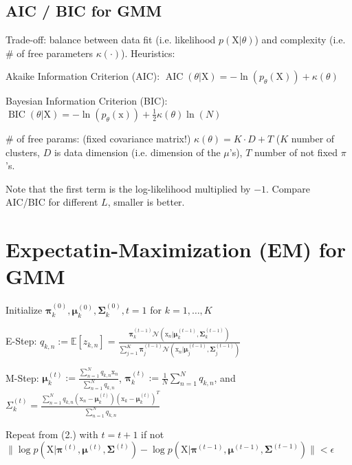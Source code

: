 \documentclass[a4paper, 11pt, landscape]{article}
\newcommand{\matr}[1]{\boldsymbol{\mathrm{#1}}}
\begin{document}
\begin{multicols*}{3}
\subsection{AIC / BIC for GMM}
Trade-off: balance between data fit (i.e. likelihood $p(\matr{X} | \theta)$) and complexity (i.e. \# of free parameters $\kappa(\cdot)$). Heuristics:
\begin{compactdesc}
	\item[Akaike Information Criterion (AIC):] $\operatorname{AIC}(\theta | \matr{X}) = -\ln(p_\theta(\matr{X})) + \kappa(\theta)$
	\item[Bayesian Information Criterion (BIC):] $\operatorname{BIC}(\theta | \matr{X}) = -\ln(p_\theta(\matr{x})) + \frac{1}{2} \kappa(\theta) \ln(N)$
	\item[\# of free params:] (fixed covariance matrix!) $\kappa(\theta) = K \cdot D + T$ ($K$ number of clusters, $D$ is data dimension (i.e. dimension of the $\mu$'s), $T$ number of not fixed $\pi$'s.
\end{compactdesc}
Note that the first term is the log-likelihood multiplied by $-1$. Compare AIC/BIC for different $L$, smaller is better.


\section{Expectatin-Maximization (EM) for GMM}
\begin{compactenum}
	\item Initialize $\boldsymbol{\pi}_k^{(0)}, \boldsymbol{\mu}_k^{(0)}, \boldsymbol{\Sigma}_k^{(0)}, t = 1$ for $k = 1, \ldots, K$
	\item E-Step: $q_{k,n} := \mathbb{E}[z_{k,n}] = \frac{\boldsymbol{\pi}_k^{(t-1)} \mathcal{N}(\matr{x}_n | \boldsymbol{\mu}_k^{(t-1)}, \boldsymbol{\Sigma}_k^{(t-1)})}{\sum_{j=1}^K \boldsymbol{\pi}_j^{(t-1)} \mathcal{N}(\matr{x}_n | \boldsymbol{\mu}_j^{(t-1)}, \boldsymbol{\Sigma}_j^{(t-1)})}$
	\item M-Step: $\boldsymbol{\mu}_k^{(t)} := \frac{\sum_{n=1}^N q_{k,n} \matr{x}_n}{\sum_{n=1}^N q_{k,n}}$, $\boldsymbol{\pi}_k^{(t)} := \frac{1}{N} \sum_{n=1}^N q_{k,n}$, and $\Sigma_k^{(t)} = \frac{\sum_{n=1}^N q_{k, n} (\matr{x}_n - \boldsymbol{\mu}_k^{(t)})(\matr{x}_k - \boldsymbol{\mu}_k^{(t)})^T}{\sum_{n=1}^N q_{k,n}}$
	\item Repeat from (2.) with $t = t + 1$ if not $\| \log p(\matr{X} | \boldsymbol{\pi}^{(t)}, \boldsymbol{\mu}^{(t)}, \boldsymbol{\Sigma}^{(t)}) - \log p(\matr{X} | \boldsymbol{\pi}^{(t-1)}, \boldsymbol{\mu}^{(t-1)}, \boldsymbol{\Sigma}^{(t-1)}) \| < \epsilon$
\end{compactenum}



\end{multicols*}
\end{document}
